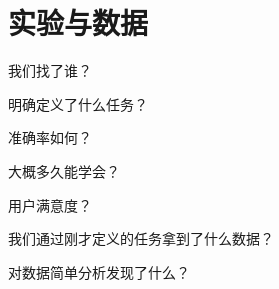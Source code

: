 \chapter{实验与数据}

    我们找了谁？

    明确定义了什么任务？

    准确率如何？

    大概多久能学会？

    用户满意度？

    我们通过刚才定义的任务拿到了什么数据？

    对数据简单分析发现了什么？